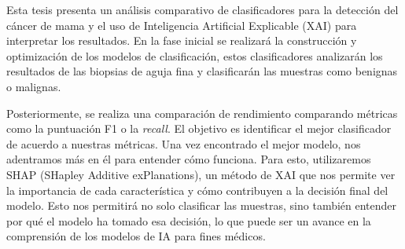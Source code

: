 Esta 
tesis 
presenta un análisis comparativo de clasificadores para la detección del cáncer de mama y el uso de Inteligencia Artificial Explicable (XAI) para interpretar los resultados. En la fase inicial se realizará la construcción y optimización de los modelos de clasificación, estos clasificadores analizarán los resultados de las biopsias de aguja fina y clasificarán las muestras como benignas o malignas.

Posteriormente, se realiza una comparación de rendimiento comparando métricas como la puntuación F1 o la \textit{recall}. El objetivo es identificar el mejor clasificador de acuerdo a nuestras métricas. Una vez encontrado el mejor modelo, nos adentramos más en él para entender cómo funciona. Para esto, utilizaremos SHAP (SHapley Additive exPlanations), un método de XAI que nos permite ver la importancia de cada característica y cómo contribuyen a la decisión final del modelo. Esto nos permitirá no solo clasificar las muestras, sino también entender por qué el modelo ha tomado esa decisión, lo que puede ser un avance en la comprensión de los modelos de 
IA 
para fines médicos.

